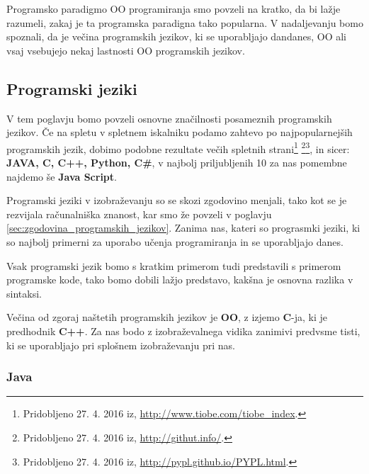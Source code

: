 Programsko paradigmo OO programiranja smo povzeli na kratko, da bi
lažje razumeli, zakaj je ta programska paradigna tako popularna. V
nadaljevanju bomo spoznali, da je večina programskih jezikov, ki se
uporabljajo dandanes, OO ali vsaj vsebujejo nekaj lastnosti OO
programskih jezikov.

\subsection{Programski jeziki}
\label{sec:programski_jeziki}

V tem poglavju bomo povzeli osnovne značilnosti posameznih programskih
jezikov. Če na spletu v spletnem iskalniku podamo zahtevo
po najpopularnejših programskih jezik, dobimo podobne rezultate
večih spletnih strani\footnote{Pridobljeno 27. 4. 2016 iz,
  \url{http://www.tiobe.com/tiobe_index}.}  \footnote{Pridobljeno
  27. 4. 2016 iz, \url{http://githut.info/}.}\footnote{Pridobljeno
  27. 4. 2016 iz, \url{http://pypl.github.io/PYPL.html}.},  in sicer: \textbf{JAVA,
  C, C++, Python, C\#}, v najbolj priljubljenih 10 za nas pomembne najdemo še
\textbf{Java Script}. %

Programski jeziki v izobraževanju so se skozi zgodovino menjali,
tako kot se je rezvijala računalniška znanost, kar smo že povzeli v
poglavju \ref{sec:zgodovina_programskih_jezikov}. Zanima nas, kateri so
prograsmki jeziki, ki so najbolj primerni za uporabo učenja
programiranja in se uporabljajo danes.

Vsak programski jezik bomo s kratkim primerom tudi predstavili s
primerom programske kode, tako bomo dobili lažjo predstavo, kakšna je
osnovna razlika v sintaksi.

Večina od zgoraj naštetih programskih jezikov je \textbf{OO}, z
izjemo \textbf{C}-ja, ki je predhodnik \textbf{C++}. Za nas bodo z
izobraževalnega vidika zanimivi predvsme tisti, ki se uporabljajo pri
splošnem izobraževanju pri nas.




\subsubsection{Java}
\label{sec:pj:JAVA}

